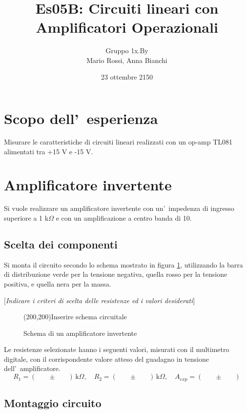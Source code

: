 \documentclass[10pt,a4paper]{article}
\author{Gruppo 1x.By \\ Mario Rossi, Anna Bianchi \rem{non dimenticate i nomi}}
\title{Es05B: Circuiti lineari con Amplificatori Operazionali}
\newcommand{\rem}[1]{[\emph{#1}]}
\newcommand{\exn}{\phantom{xxx}}
\begin{document}
\date{23 ottembre 2150}
\maketitle


\section*{Scopo dell'~esperienza}
Misurare le caratteristiche di circuiti lineari realizzati con un op-amp TL081 alimentati tra +15 V e -15 V.

\section{Amplificatore invertente}
Si vuole realizzare un amplificatore invertente con un'~impedenza di ingresso superiore a 1 
k$\Omega$ e con un amplificazione a centro banda di 10.

\subsection{Scelta dei componenti}

Si monta il circuito secondo lo schema mostrato in figura \ref{fig:ampinv}, utilizzando la barra di 
distribuzione verde per la tensione negativa, quella rosso per la tensione positiva, e quella nera per 
la massa.

\rem{Indicare i criteri di scelta delle resistenze ed i valori desiderati}
%
\begin{figure}[h]
\begin{center}
\framebox(200,200){Inserire schema circuitale}
\caption{\small Schema di un amplificatore invertente}
\label{fig:ampinv}
\end{center}
\end{figure}
%

Le resistenze selezionate hanno i seguenti valori, misurati con il multimetro digitale, con il corrispondente valore atteso 
del guadagno in tensione dell'~amplificatore.
\[
R_1 = ( \exn \pm \exn) \,\mathrm{k}\Omega, \quad 
R_2 = ( \exn \pm \exn) \,\mathrm{k}\Omega, \quad 
A_{exp} = ( \exn \pm \exn)
\]

\subsection{Montaggio circuito}

\end{document}
